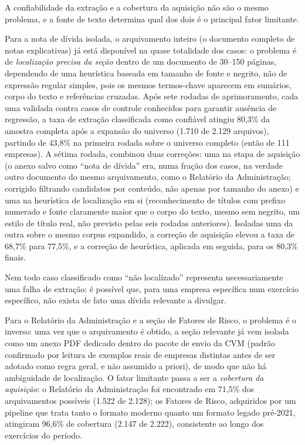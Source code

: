 \documentclass[a4paper,12pt]{report}
\begin{document}
A confiabilidade da extração e a cobertura da aquisição não são o mesmo problema, e a fonte de texto determina qual dos dois é o principal fator limitante.

Para a nota de dívida isolada, o arquivamento inteiro (o documento completo de notas explicativas) já está disponível na quase totalidade dos casos: o problema é de \textit{localização precisa da seção} dentro de um documento de 30--150 páginas, dependendo de uma heurística baseada em tamanho de fonte e negrito, não de expressão regular simples, pois os mesmos termos-chave aparecem em sumários, corpo do texto e referências cruzadas. Após sete rodadas de aprimoramento, cada uma validada contra casos de controle conhecidos para garantir ausência de regressão, a taxa de extração classificada como confiável atingiu 80,3\% da amostra completa após a expansão do universo (1.710 de 2.129 arquivos), partindo de 43,8\% na primeira rodada sobre o universo completo (então de 111 empresas). A sétima rodada, combinou duas correções: uma na etapa de aquisição (o anexo salvo como ``nota de dívida'' era, numa fração dos casos, na verdade outro documento do mesmo arquivamento, como o Relatório da Administração; corrigido filtrando candidatos por conteúdo, não apenas por tamanho do anexo) e uma na heurística de localização em si (reconhecimento de títulos com prefixo numerado e fonte claramente maior que o corpo do texto, mesmo sem negrito, um estilo de título real, não previsto pelas seis rodadas anteriores). Isoladas uma da outra sobre o mesmo corpus expandido, a correção de aquisição elevou a taxa de 68,7\% para 77,5\%, e a correção de heurística, aplicada em seguida, para os 80,3\% finais.

Nem todo caso classificado como ``não localizado'' representa necessariamente uma falha de extração: é possível que, para uma empresa específica num exercício específico, não exista de fato uma dívida relevante a divulgar.

Para o Relatório da Administração e a seção de Fatores de Risco, o problema é o inverso: uma vez que o arquivamento é obtido, a seção relevante já vem isolada como um anexo PDF dedicado dentro do pacote de envio da CVM (padrão confirmado por leitura de exemplos reais de empresas distintas antes de ser adotado como regra geral, e não assumido a priori), de modo que não há ambiguidade de localização. O fator limitante passa a ser a \textit{cobertura da aquisição}: o Relatório da Administração foi encontrado em 71,5\% dos arquivamentos possíveis (1.522 de 2.128); os Fatores de Risco, adquiridos por um pipeline que trata tanto o formato moderno quanto um formato legado pré-2021, atingiram 96,6\% de cobertura (2.147 de 2.222), consistente ao longo dos exercícios do período.
\end{document}
